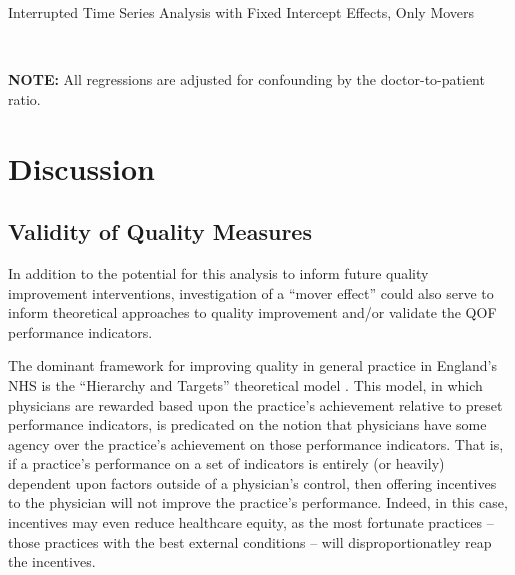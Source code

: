 \documentclass[11pt]{article}
\begin{document}
\begin{landscape}
  \begin{table}[htp]
  \caption{Interrupted Time Series Analysis with Fixed Intercept Effects, Only Movers}
    \begin{threeparttable}
      \\
    \begin{tablenotes}
    \footnotesize
    \textbf{NOTE:} All regressions are adjusted for confounding by the doctor-to-patient ratio.
    \end{tablenotes}
    \end{threeparttable}
    \label{tab:MainITSA}
  \end{table}
\end{landscape}








\section{Discussion}

\subsection{Validity of Quality Measures}

In addition to the potential for this analysis to inform future quality improvement interventions, investigation of a ``mover effect'' could also serve to inform theoretical approaches to quality improvement and/or validate the QOF performance indicators.

The dominant framework for improving quality in general practice in England's NHS is the ``Hierarchy and Targets'' theoretical model \citep{bevanModelsGovernancePublic2013}. This model, in which physicians are rewarded based upon the practice's achievement relative to preset performance indicators, is predicated on the notion that physicians have some agency over the practice's achievement on those performance indicators. That is, if a practice's performance on a set of indicators is entirely (or heavily) dependent upon factors outside of a physician's control, then offering incentives to the physician will not improve the practice's performance. Indeed, in this case, incentives may even reduce healthcare equity, as the most fortunate practices -- those practices with the best external conditions -- will disproportionatley reap the incentives.
\end{document}
